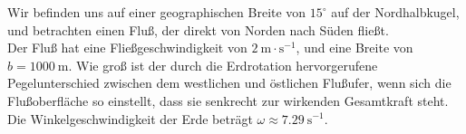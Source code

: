 \begin{minipage}[b]{0.75\textwidth}
\begin{Exercise}[difficulty = 3, origin = Orpheus e.V, title = Fluß, label = cori1]
	Wir befinden uns auf einer geographischen Breite von $15^\circ$ auf der Nordhalbkugel, und betrachten einen Fluß, der direkt von Norden nach Süden fließt.\\ Der Fluß hat eine Fließgeschwindigkeit von $2~\mathrm{m\cdot s^{-1}}$, und eine Breite von $b = 1000~\mathrm{m}$. Wie groß ist der durch die Erdrotation hervorgerufene Pegelunterschied zwischen dem westlichen und östlichen Flußufer, wenn sich die Flußoberfläche so einstellt, dass sie senkrecht zur wirkenden Gesamtkraft steht. Die Winkelgeschwindigkeit der Erde beträgt $\omega \approx 7.29~\mathrm{s^{-1}}$.
\end{Exercise}
\end{minipage}
\hfill
\begin{minipage}[b]{0.2\textwidth}
	
\end{minipage}
